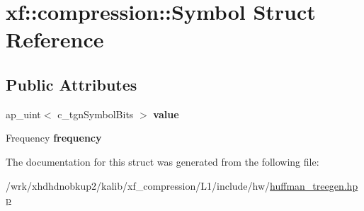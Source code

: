 \hypertarget{structxf_1_1compression_1_1Symbol}{\section{xf\-:\-:compression\-:\-:Symbol Struct Reference}
\label{structxf_1_1compression_1_1Symbol}
}
\subsection*{Public Attributes}
\begin{DoxyCompactItemize}
\item 
\hypertarget{structxf_1_1compression_1_1Symbol_abfb2379c9cebaad8fed374f5d95c99e0}{ap\-\_\-uint$<$ c\-\_\-tgn\-Symbol\-Bits $>$ {\bfseries value}}\label{structxf_1_1compression_1_1Symbol_abfb2379c9cebaad8fed374f5d95c99e0}

\item 
\hypertarget{structxf_1_1compression_1_1Symbol_aae386e791b6d55a0731e52bc6328806d}{Frequency {\bfseries frequency}}\label{structxf_1_1compression_1_1Symbol_aae386e791b6d55a0731e52bc6328806d}

\end{DoxyCompactItemize}


The documentation for this struct was generated from the following file\-:\begin{DoxyCompactItemize}
\item 
/wrk/xhdhdnobkup2/kalib/xf\-\_\-compression/\-L1/include/hw/\hyperlink{huffman__treegen_8hpp}{huffman\-\_\-treegen.\-hpp}\end{DoxyCompactItemize}
